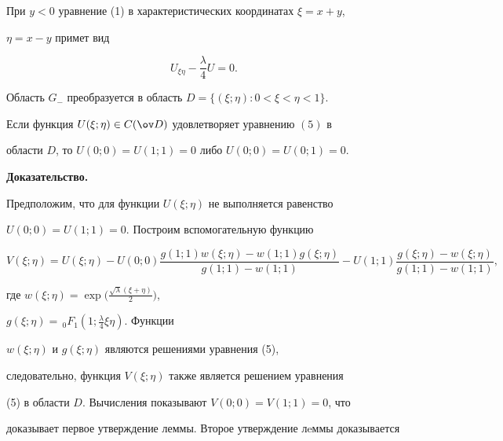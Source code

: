  


При $y<0$ уравнение (1) в характеристических координатах $\xi=x+y$, 


$\eta=x-y$ примет вид 


\begin{equation} 


U_{\xi\eta}-\frac{\lambda}{4}U=0. 


\end{equation} 


 


Область $G_-$ преобразуется в область $D=\{(\xi;\eta):0<\xi<\eta<1\}$. 


 


\begin{lem} 


Если функция $U(\xi;\eta)\in C(\ov D)$ удовлетворяет уравнению $(5)$ в 


области $D$, то $U(0;0)=U(1;1)=0$ либо $U(0;0)=U(0;1)=0$. 


\end{lem} 


 


{\bf Доказательство.} 


Предположим, что для функции $U(\xi;\eta)$ не выполняется равенство 


$U(0;0)=U(1;1)=0$. Построим вспомогательную функцию 


$$ 


V(\xi;\eta)=U(\xi;\eta)-U(0;0) 


\frac{g(1;1)w(\xi;\eta)-w(1;1)g(\xi;\eta)} 


{g(1;1)-w(1;1)}-U(1;1) 


\frac{g(\xi;\eta)-w(\xi;\eta)}{g(1;1)-w(1;1)}, 


$$ 


где $w(\xi;\eta)=\exp\big(\frac{\sqrt{\lambda}(\xi+\eta)}{2}\big)$, 


$g(\xi;\eta)=\,{}_0F_1(1;\frac{\lambda}{4}\xi\eta)$. Функции 


$w(\xi;\eta)$ и $g(\xi;\eta)$ являются решениями уравнения (5), 


следовательно, функция $V(\xi;\eta)$ также является решением уравнения 


(5) в области $D$. Вычисления показывают $V(0;0)=V(1;1)=0$, что 


доказывает первое утверждение леммы. Второе утверждение лeммы доказывается 


